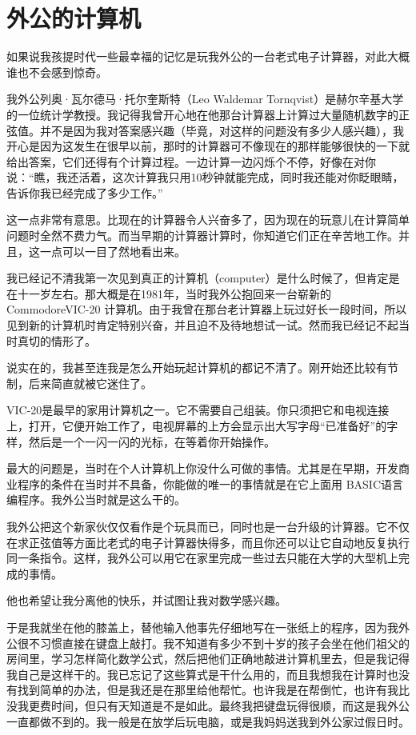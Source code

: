 \documentclass[12pt,UTF8]{ctexbook}
\begin{document}
\section{外公的计算机}

如果说我孩提时代一些最幸福的记忆是玩我外公的一台老式电子计算器，对此大概谁也不会感到惊奇。

我外公列奥·瓦尔德马·托尔奎斯特（Leo Waldemar Tornqvist）是赫尔辛基大学的一位统计学教授。我记得我曾开心地在他那台计算器上计算过大量随机数字的正弦值。并不是因为我对答案感兴趣（毕竟，对这样的问题没有多少人感兴趣），我开心是因为这发生在很早以前，那时的计算器可不像现在的那样能够很快的一下就给出答案，它们还得有个计算过程。一边计算一边闪烁个不停，好像在对你说：“瞧，我还活着，这次计算我只用10秒钟就能完成，同时我还能对你眨眼睛，告诉你我已经完成了多少工作。”

这一点非常有意思。比现在的计算器令人兴奋多了，因为现在的玩意儿在计算简单问题时全然不费力气。而当早期的计算器计算时，你知道它们正在辛苦地工作。并且，这一点可以一目了然地看出来。

我已经记不清我第一次见到真正的计算机（computer）是什么时候了，但肯定是在十一岁左右。那大概是在1981年，当时我外公抱回来一台崭新的 CommodoreVIC-20 计算机。由于我曾在那台老计算器上玩过好长一段时间，所以见到新的计算机时肯定特别兴奋，并且迫不及待地想试一试。然而我已经记不起当时真切的情形了。

说实在的，我甚至连我是怎么开始玩起计算机的都记不清了。刚开始还比较有节制，后来简直就被它迷住了。

VIC-20是最早的家用计算机之一。它不需要自己组装。你只须把它和电视连接上，打开，它便开始工作了，电视屏幕的上方会显示出大写字母“已准备好”的字样，然后是一个一闪一闪的光标，在等着你开始操作。

最大的问题是，当时在个人计算机上你没什么可做的事情。尤其是在早期，开发商业程序的条件在当时并不具备，你能做的唯一的事情就是在它上面用 BASIC语言编程序。我外公当时就是这么干的。

我外公把这个新家伙仅仅看作是个玩具而已，同时也是一台升级的计算器。它不仅在求正弦值等方面比老式的电子计算器快得多，而且你还可以让它自动地反复执行同一条指令。这样，我外公可以用它在家里完成一些过去只能在大学的大型机上完成的事情。

他也希望让我分离他的快乐，并试图让我对数学感兴趣。

于是我就坐在他的膝盖上，替他输入他事先仔细地写在一张纸上的程序，因为我外公很不习惯直接在键盘上敲打。我不知道有多少不到十岁的孩子会坐在他们祖父的房间里，学习怎样简化数学公式，然后把他们正确地敲进计算机里去，但是我记得我自己是这样干的。我已忘记了这些算式是干什么用的，而且我想我在计算时也没有找到简单的办法，但是我还是在那里给他帮忙。也许我是在帮倒忙，也许有我比没我更费时间，但只有天知道是不是如此。最终我把键盘玩得很顺，而这是我外公一直都做不到的。我一般是在放学后玩电脑，或是我妈妈送我到外公家过假日时。
\end{document}
